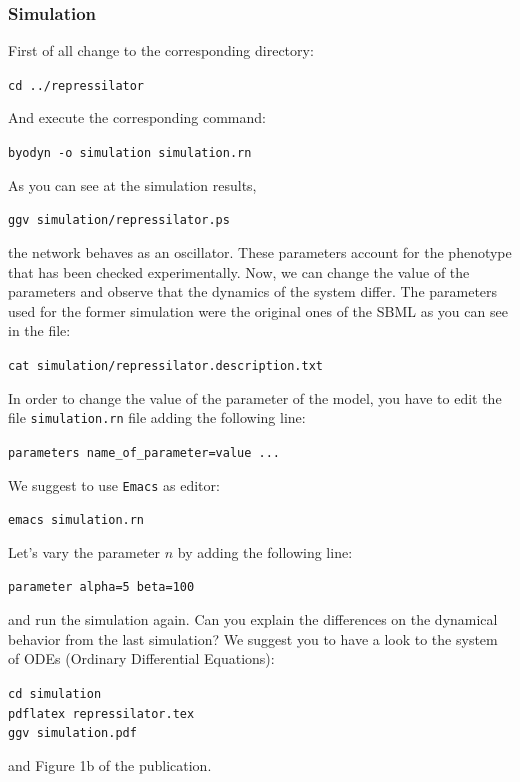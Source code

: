 \documentclass[a4paper, 11pt]{article}
\begin{document}
  \subsubsection{Simulation}
  First of all change to the corresponding directory:
  \begin{center}
    \texttt{cd ../repressilator}
  \end{center}
  And execute the corresponding command:
  \begin{center}
    \texttt{byodyn -o simulation simulation.rn}
   \end{center}
   As you can see at the simulation results, 
   \begin{center}
     \texttt{ggv simulation/repressilator.ps}
   \end{center}
   the network behaves as an oscillator.
   These parameters account for the phenotype that has been checked experimentally.
   Now, we can change the value of the parameters and observe that the dynamics of the system differ.
   The parameters used for the former simulation were the original ones of the SBML as you can see in the file:
   \begin{center}
     \texttt{cat simulation/repressilator.description.txt}
   \end{center}
   In order to change the value of the parameter of the model, you have to edit the file \texttt{simulation.rn} file adding the following line:
   \begin{center}
     \texttt{parameters   name\_of\_parameter=value  ...}
   \end{center}
   We suggest to use \texttt{Emacs} as editor:
   \begin{center}
     \texttt{emacs simulation.rn}
   \end{center}
   Let's vary the parameter $n$ by adding the following line: 
   \begin{center}
     \texttt{parameter	alpha=5			beta=100}
   \end{center}
   and run the simulation again.
   Can you explain the differences on the dynamical behavior from the last simulation?
   We suggest you to have a look to the system of ODEs (Ordinary Differential Equations):
   \begin{center}
     \texttt{cd simulation}\\
     \texttt{pdflatex repressilator.tex}\\
     \texttt{ggv simulation.pdf}
   \end{center}
   and Figure 1b of the \cite{elowitz00} publication.
\end{document}
